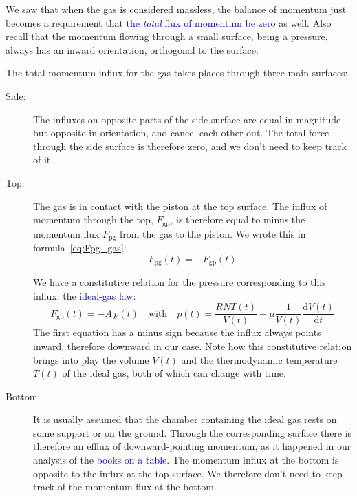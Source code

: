 \documentclass[a4paper,12pt,%
onecolumn,oneside,titlepage,%
british%
]{memoir}
\newcommand*{\di}{\mathrm{d}}%
\renewcommand*{\|}[1][]{\nonscript\:#1\vert\nonscript\:\mathopen{}}
\newcommand*{\sect}{\S}%
\renewcommand*{\autoref}[2]{\sidepar{\vspace{-1ex}\footnotesize{\color{blue}\faIcon{%
reply%
}\enspace\sect\,\ref{#1} page\,\pageref{#1}}}\textcolor{blue}{#2}}
\newcommand*{\yN}{N}
\newcommand*{\yFpg}{F_{\text{pg}}}
\newcommand*{\yFgp}{F_{\text{gp}}}
\newcommand*{\yvis}{\mu}%
\newcommand*{\yte}{T}%
\begin{document}
\medskip

We saw that when the gas is considered massless, the balance of momentum just becomes a requirement that \autoref{sec:further_idealgas}{the \emph{total} flux of momentum be zero} as well. Also recall that the momentum flowing through a small surface, being a pressure, always has an inward orientation, orthogonal to the surface.

The total momentum influx for the gas takes places through three main surfaces:
\begin{description}
\item[Side:] The influxes on opposite parts of the side surface are equal in magnitude but opposite in orientation, and cancel each other out. The total force through the side surface is therefore zero, and we don't need to keep track of it.

\item[Top:] The gas is in contact with the piston at the top surface. The influx of momentum through the top, $\yFgp$, is therefore equal to minus the momentum flux $\yFpg$ from the gas to the piston. We wrote this in formula~\eqref{eq:Fpg_gas}:
  \begin{equation*}
    \yFpg(t) = -\yFgp(t)
  \end{equation*}

  We have a constitutive relation for the pressure corresponding to this influx: the \autoref{def:idealgas_law}{ideal-gas law}:
  \begin{equation*}
    \yFgp(t) = -A\,p(t)
    \quad\text{with}\quad
    p(t) = \frac{R \yN \yte(t)}{V(t)}  - \yvis \frac{1}{V(t)}\frac{\di V(t)}{\di t}
  \end{equation*}
  The first equation has a minus sign because the influx always points inward, therefore downward in our case. Note how this constitutive relation brings into play the volume $V(t)$ and the thermodynamic temperature $\yte(t)$ of the ideal gas, both of which can change with time.

\item[Bottom:] It is usually assumed that the chamber containing the ideal gas rests on some support or on the ground. Through the corresponding surface there is therefore an efflux of downward-pointing momentum, as it happened in our analysis of the \autoref{sec:bal_momentum_statics}{books on a table}. The momentum influx at the bottom is opposite to the influx at the top surface. We therefore don't need to keep track of the momentum flux at the bottom.
\end{description}
\end{document}
